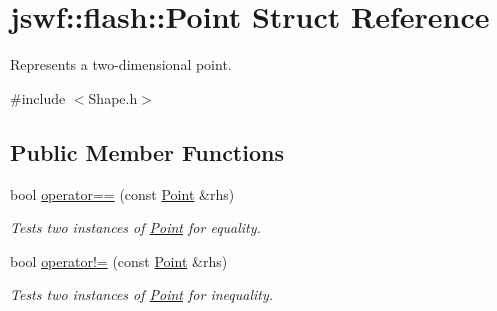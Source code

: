 \hypertarget{structjswf_1_1flash_1_1_point}{\section{jswf\+:\+:flash\+:\+:Point Struct Reference}
\label{structjswf_1_1flash_1_1_point}
}


Represents a two-\/dimensional point.  




{\ttfamily \#include $<$Shape.\+h$>$}

\subsection*{Public Member Functions}
\begin{DoxyCompactItemize}
\item 
\hypertarget{structjswf_1_1flash_1_1_point_a90a6338887dfb2bf0f1592c2e18349f8}{bool \hyperlink{structjswf_1_1flash_1_1_point_a90a6338887dfb2bf0f1592c2e18349f8}{operator==} (const \hyperlink{structjswf_1_1flash_1_1_point}{Point} \&rhs)}\label{structjswf_1_1flash_1_1_point_a90a6338887dfb2bf0f1592c2e18349f8}

\begin{DoxyCompactList}\small\item\em Tests two instances of \hyperlink{structjswf_1_1flash_1_1_point}{Point} for equality. \end{DoxyCompactList}\item 
\hypertarget{structjswf_1_1flash_1_1_point_aee97c059b203f345fa4a70d11197421b}{bool \hyperlink{structjswf_1_1flash_1_1_point_aee97c059b203f345fa4a70d11197421b}{operator!=} (const \hyperlink{structjswf_1_1flash_1_1_point}{Point} \&rhs)}\label{structjswf_1_1flash_1_1_point_aee97c059b203f345fa4a70d11197421b}

\begin{DoxyCompactList}\small\item\em Tests two instances of \hyperlink{structjswf_1_1flash_1_1_point}{Point} for inequality. \end{DoxyCompactList}\end{DoxyCompactItemize}
